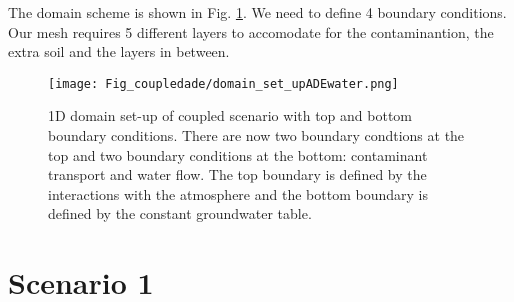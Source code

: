 \begin{table}[!h]
\centering
\caption{\label{tab_coup2}Material properties needed for scenarios.}
\end{table}

The domain scheme is shown in Fig. \ref{domain}. We need to define 4 boundary conditions. Our mesh requires 5 different layers to accomodate for the contaminantion, the extra soil and the layers in between.

\begin{figure}[!h]
\centering
\texttt{[image: Fig\_coupledade/domain\_set\_upADEwater.png]}
\caption{\label{domain}1D domain set-up of coupled scenario with top and bottom boundary conditions. There are now two boundary condtions at the top and two boundary conditions at the bottom: contaminant transport and water flow. The top boundary is defined by the interactions with the atmosphere and the bottom boundary is defined by the constant groundwater table.}
\end{figure}

\section*{Scenario 1}

